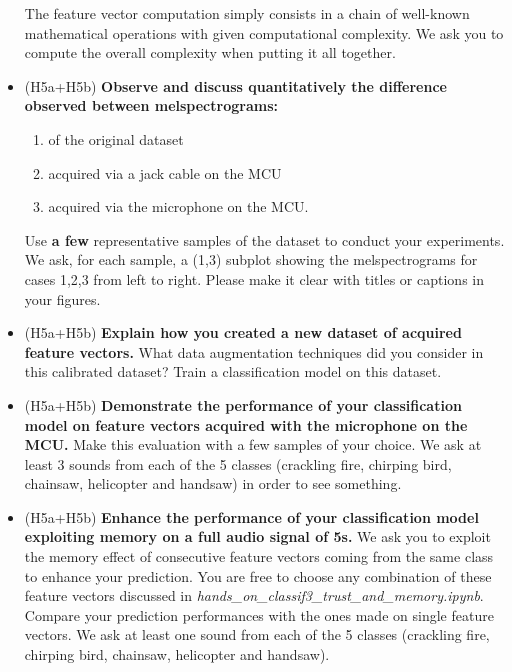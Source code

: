 \begin{itemize}
The feature vector computation simply consists in a chain of well-known mathematical operations with given computational complexity. We ask you to compute the overall complexity when putting it all together.
\item (H5a+H5b) \textbf{Observe and discuss quantitatively the difference observed between melspectrograms:}
\begin{enumerate}
    \item of the original dataset
    \item acquired via a jack cable on the MCU
    \item acquired via the microphone on the MCU.
   \end{enumerate}
     Use \textbf{a few} representative samples of the dataset to conduct your experiments.
       We ask, for each sample, a (1,3) subplot showing the melspectrograms for cases 1,2,3 from left to right. Please make it clear with titles or captions in your figures.
    \item (H5a+H5b) \textbf{Explain how you created a new dataset of acquired feature vectors.} What data augmentation techniques did you consider in this calibrated dataset? Train a classification model on this dataset. 
    \item (H5a+H5b) \textbf{Demonstrate the performance of your classification model on feature vectors acquired with the microphone on the MCU.}
    Make this evaluation with a few samples of your choice. We ask at least 3 sounds from each of the 5 classes (crackling fire, chirping bird, chainsaw, helicopter and handsaw) in order to see something.
    \item (H5a+H5b) \textbf{Enhance the performance of your classification model exploiting memory on a full audio signal of 5s.}
    We ask you to exploit the memory effect of consecutive feature vectors coming from the same class to enhance your prediction. You are free to choose any combination of these feature vectors discussed in \emph{hands\_on\_classif3\_trust\_and\_memory.ipynb}. Compare your prediction performances with the ones made on single feature vectors. We ask at least one sound from each of the 5 classes (crackling fire, chirping bird, chainsaw, helicopter and handsaw).
\end{itemize}
